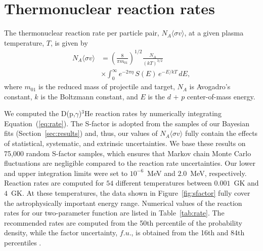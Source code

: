 \documentclass[twocolumn]{aastex63}
\begin{document}




\section{Thermonuclear reaction rates} 
\label{sec:rates}
The thermonuclear reaction rate per particle pair, $N_A \langle \sigma v \rangle$, at a given plasma temperature, $T$, is given by \citep{Iliadis:2015ta}
%
\begin{equation}
\begin{split}
N_A \langle \sigma v \rangle & = \left(\frac{8}{\pi m_{01}}\right)^{1/2} \frac{N_A}{(kT)^{3/2}}  \\ 
&  \times \int_0^\infty e^{-2\pi\eta}\,S(E)\,e^{-E/kT}\,dE, 
\label{eq:rate}
\end{split}
\end{equation}
%
where $m_{01}$ is the reduced mass of projectile and target, $N_A$ is  Avogadro's constant, $k$ is the Boltzmann constant, and $E$ is the $d$ $+$ $p$ center-of-mass energy.

We computed the D(p,$\gamma$)$^3$He reaction rates by numerically integrating Equation~(\ref{eq:rate}). The S-factor is adopted from the samples of our  Bayesian fits (Section~\ref{sec:results}) and, thus, our values of $N_A \langle \sigma v \rangle$ fully contain the effects of statistical, systematic, and extrinsic uncertainties. We base these results on 75,000 random S-factor samples, which ensures that Markov chain Monte Carlo fluctuations are negligible compared to the reaction rate uncertainties. Our lower and upper integration limits were set to $10^{-6}$~MeV and $2.0$~MeV, respectively. Reaction rates are computed for $54$ different temperatures between $0.001$~GK and $4$~GK. At these temperatures, the data shown in Figure~\ref{fig:sfactor} fully cover the astrophysically important energy range. Numerical values of the reaction rates for our two-parameter function are listed in Table~\ref{tab:rate}. The recommended rates are computed from the 50th percentile of the probability density, while the factor uncertainty, $f.u.$, is obtained from the 16th and 84th percentiles \citep{Longland:2010is}. 
\end{document}
